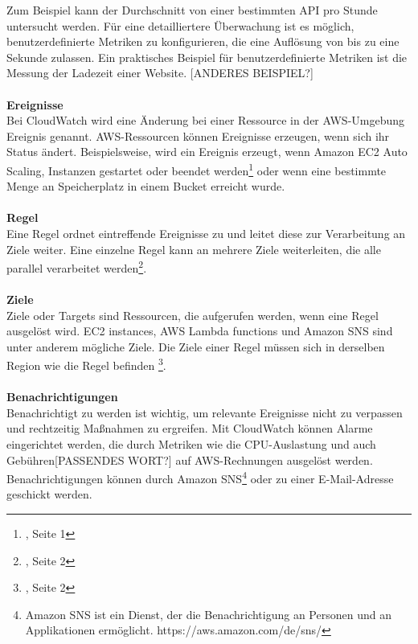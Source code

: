 Zum Beispiel kann der Durchschnitt von einer bestimmten API pro Stunde untersucht werden.
Für eine detailliertere Überwachung ist es möglich, benutzerdefinierte Metriken zu konfigurieren, die eine Auflösung von bis zu eine Sekunde zulassen. Ein praktisches Beispiel für benutzerdefinierte Metriken ist die Messung der Ladezeit einer Website.
[ANDERES BEISPIEL?]
\\\\
\textbf{Ereignisse} 
\\
Bei CloudWatch wird eine Änderung bei einer Ressource in der AWS-Umgebung Ereignis genannt. 
AWS-Ressourcen können Ereignisse erzeugen, wenn sich ihr Status ändert.
Beispielsweise, wird ein Ereignis erzeugt, wenn Amazon EC2 Auto Scaling, Instanzen gestartet oder beendet werden\footnote{\cite{AMZ13}, Seite 1} oder wenn eine bestimmte Menge an Speicherplatz in einem Bucket erreicht wurde.
\\\\
\textbf{Regel} \\
Eine Regel ordnet eintreffende Ereignisse zu und leitet diese zur Verarbeitung an Ziele weiter.
Eine einzelne Regel kann an mehrere Ziele weiterleiten, die alle parallel verarbeitet werden\footnote{\cite{AMZ13}, Seite 2}.
\\\\
\textbf{Ziele} \\
Ziele oder Targets sind Ressourcen, die aufgerufen werden, wenn eine Regel ausgelöst wird.
EC2 instances, AWS Lambda functions und Amazon SNS sind unter anderem mögliche Ziele.
Die Ziele einer Regel müssen sich in derselben Region wie die Regel befinden
\footnote{\cite{AMZ13}, Seite 2}.
\\\\
\textbf{Benachrichtigungen}\\
Benachrichtigt zu werden ist wichtig, um relevante Ereignisse nicht zu verpassen und rechtzeitig Maßnahmen zu ergreifen. Mit CloudWatch können Alarme eingerichtet werden, die durch Metriken wie die CPU-Auslastung und auch Gebühren[PASSENDES WORT?] auf AWS-Rechnungen ausgelöst werden.
Benachrichtigungen können durch Amazon SNS\footnote{Amazon SNS ist ein Dienst, der die Benachrichtigung an Personen und an Applikationen ermöglicht. https://aws.amazon.com/de/sns/} oder zu einer E-Mail-Adresse geschickt werden.
